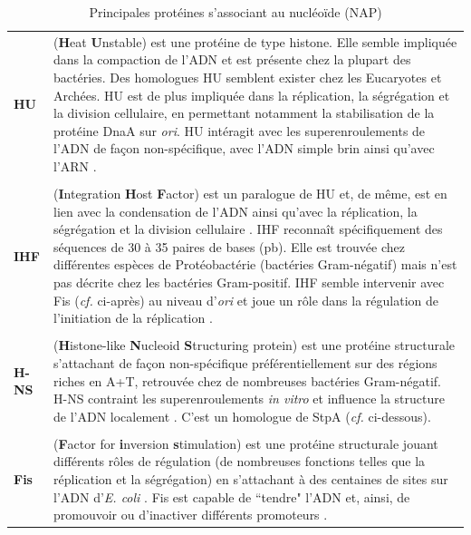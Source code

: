 \begin{longtable}{@{\hspace{-2cm}\hspace{1cm}} >{\bfseries}p{} | >{\small}p{\textwidth}}
	\caption{Principales protéines s'associant au nucléoïde (NAP)}
	\label{tabnap}\\
	\endfirsthead
	HU & (\textbf{H}eat \textbf{U}nstable) est une protéine de type histone. Elle semble impliquée dans la compaction de l'ADN et est présente chez la plupart des bactéries. Des homologues HU semblent exister chez les Eucaryotes et Archées. HU est de plus impliquée dans la réplication, la ségrégation et la division cellulaire, en permettant notamment la stabilisation de la protéine DnaA sur \textit{ori}. HU intéragit avec les superenroulements de l'ADN de façon non-spécifique, avec l'ADN simple brin ainsi qu'avec l'ARN \citep{Johnson2005a}.\\
	\\[-0.2cm]
	IHF & (\textbf{I}ntegration \textbf{H}ost \textbf{F}actor) est un paralogue de HU et, de même, est en lien avec la condensation de l'ADN ainsi qu'avec la réplication, la ségrégation et la division cellulaire \citep{Johnson2005a}. IHF reconnaît spécifiquement des séquences de 30 à 35 paires de bases (pb). Elle est trouvée chez différentes espèces de Protéobactérie (bactéries Gram-négatif) mais n'est pas décrite chez les bactéries Gram-positif. IHF semble intervenir avec Fis (\textit{cf.} ci-après) au niveau d'\textit{ori} et joue un rôle dans la régulation de l'initiation de la réplication \citep{Johnson2005a}.\\
	\\[-0.2cm]
	H-NS & (\textbf{H}istone-like \textbf{N}ucleoid \textbf{S}tructuring protein) est une protéine structurale s'attachant de façon non-spécifique préférentiellement sur des régions riches en A+T, retrouvée chez de nombreuses bactéries Gram-négatif. H-NS contraint les superenroulements \textit{in vitro} et influence la structure de l'ADN localement \citep{Johnson2005a}. C'est un homologue de StpA (\textit{cf.} ci-dessous).\\
	\\[-0.2cm]
	Fis & (\textbf{F}actor for \textbf{i}nversion \textbf{s}timulation) est une protéine structurale jouant différents rôles de régulation (de nombreuses fonctions telles que la réplication et la ségrégation) en s'attachant à des centaines de sites sur l'ADN d'\textit{E. coli} \citep{Browning2010}. Fis est capable de ``tendre" l'ADN et, ainsi, de promouvoir ou d'inactiver différents promoteurs \citep{Dillon2010}.\\

\end{longtable}
